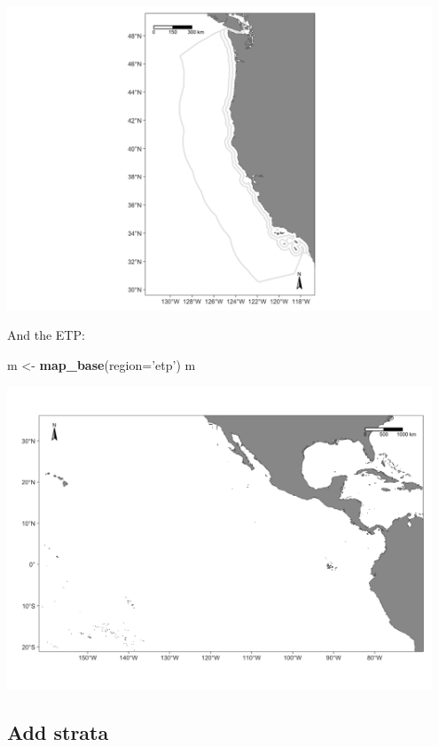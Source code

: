\documentclass[
]{book}
\newenvironment{Shaded}{\begin{snugshade}}{\end{snugshade}}
\newcommand{\DataTypeTok}[1]{\textcolor[rgb]{0.13,0.29,0.53}{#1}}
\newcommand{\KeywordTok}[1]{\textcolor[rgb]{0.13,0.29,0.53}{\textbf{#1}}}
\newcommand{\NormalTok}[1]{#1}
\newcommand{\StringTok}[1]{\textcolor[rgb]{0.31,0.60,0.02}{#1}}
\begin{document}
\includegraphics[width=0.95\textwidth,height=\textheight]{img/map_ccs.png}

And the ETP:

\begin{Shaded}
\begin{Highlighting}[]
\NormalTok{m <-}\StringTok{ }\KeywordTok{map_base}\NormalTok{(}\DataTypeTok{region=}\StringTok{'etp'}\NormalTok{)}
\NormalTok{m}
\end{Highlighting}
\end{Shaded}

\includegraphics[width=0.95\textwidth,height=\textheight]{img/map_etp.png}

\hypertarget{add-strata}{%
\subsection*{Add strata}\label{add-strata}}
\end{document}

